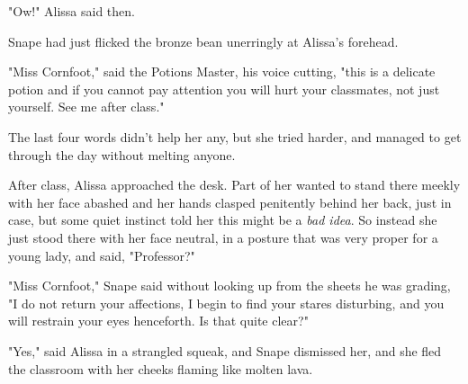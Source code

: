 "Ow!" Alissa said then.

Snape had just flicked the bronze bean unerringly at Alissa's forehead.

"Miss Cornfoot," said the Potions Master, his voice cutting, "this is a 
delicate potion and if you cannot pay attention you will hurt your classmates, 
not just yourself. See me after class."

The last four words didn't help her any, but she tried harder, and managed to 
get through the day without melting anyone.

After class, Alissa approached the desk. Part of her wanted to stand there 
meekly with her face abashed and her hands clasped penitently behind her back, 
just in case, but some quiet instinct told her this might be a \emph{bad idea}. 
So instead she just stood there with her face neutral, in a posture that was 
very proper for a young lady, and said, "Professor?"

"Miss Cornfoot," Snape said without looking up from the sheets he was grading, 
"I do not return your affections, I begin to find your stares disturbing, and 
you will restrain your eyes henceforth. Is that quite clear?"

"Yes," said Alissa in a strangled squeak, and Snape dismissed her, and she fled 
the classroom with her cheeks flaming like molten lava.